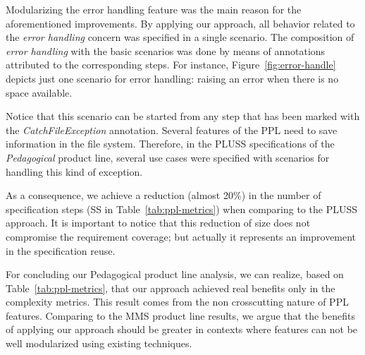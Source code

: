 Modularizing the error handling feature was the main reason for the aforementioned improvements. By
applying our approach, all behavior related to the \emph{error handling} concern
was specified in a single scenario. The composition of \emph{error handling} with
the basic scenarios was done by means of annotations attributed to the
corresponding steps. For instance, Figure~\ref{fig:error-handle} depicts just one
scenario for error handling: raising  an error when there is no space available.


Notice that this scenario can be started from any step that has been marked with
the \emph{CatchFileException} annotation.
Several features of the PPL need to save information in the file system.
Therefore, in the PLUSS specifications of the \emph{Pedagogical}
product line, several use cases were specified with scenarios for handling this
kind of exception.

As a consequence, we achieve a reduction (almost 20\%) in the number of
specification steps (SS in Table~\ref{tab:ppl-metrics}) when comparing to the
PLUSS approach. It is important to notice that this reduction of size does not
compromise the requirement coverage; but actually it represents an improvement in
the specification reuse.

For concluding our Pedagogical product line analysis, we can realize, based on
Table~\ref{tab:ppl-metrics}, that our approach achieved real benefits only in the
complexity metrics. This result comes from the non crosscutting nature of PPL
features. Comparing to the MMS product line results, we argue that the benefits
of applying our approach should be greater in contexts where features can not be
well modularized using existing techniques. 